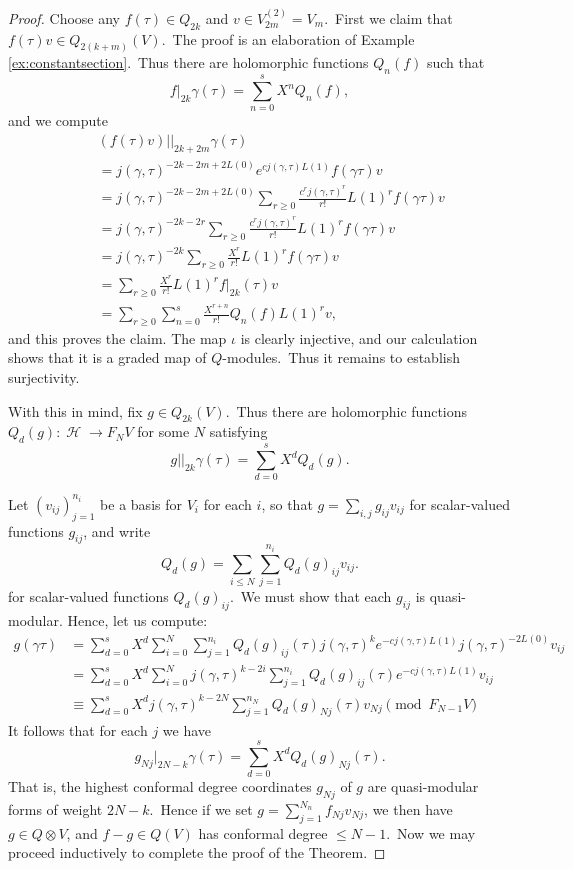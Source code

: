 \documentclass[12pt]{amsart}
\theoremstyle{plain}
\theoremstyle{definition}
\theoremstyle{remark}
\DeclareMathOperator{\uhp}{\mathcal{H}}
\begin{document}
\begin{proof}
Choose any $f(\tau)\in Q_{2k}$ and $v\in V_{2m}^{(2)}=V_{m}$.\ First we claim that
$f(\tau)v\in Q_{2(k+m)}(V)$.\ The proof is an elaboration of Example \ref{ex:constantsection}.\ Thus there are holomorphic functions $Q_n(f)$ such that
$$f|_{2k}\gamma(\tau)=\sum_{n=0}^s X^nQ_n(f),$$
and we compute
\begin{eqnarray*}
&&(f(\tau)v)||_{2k+2m}\gamma(\tau) \\
&&=    j(\gamma, \tau)^{-2k-2m+2L(0)}e^{cj(\gamma, \tau) L(1)}f(\gamma\tau)v\\
&&=j(\gamma, \tau)^{-2k-2m+2L(0)}\sum_{r\geq0} \frac{c^rj(\gamma, \tau)^r}{r!}L(1)^r f(\gamma\tau)v\\
&&=j(\gamma, \tau)^{-2k-2r}\sum_{r\geq0} \frac{c^rj(\gamma, \tau)^r}{r!}L(1)^r f(\gamma\tau)v\\
&&=j(\gamma, \tau)^{-2k}\sum_{r\geq0} \frac{X^r}{r!}L(1)^r f(\gamma\tau)v\\
&&=\sum_{r\geq0} \frac{X^r}{r!}L(1)^r f|_{2k}(\tau)v\\
&&=\sum_{r\geq0}\sum_{n=0}^s \frac{X^{r+n}}{r!}Q_n(f)L(1)^r v,
\end{eqnarray*}
and this proves the claim. The map $\iota$ is clearly injective, and our calculation shows that it is a graded map of $Q$-modules.\ Thus it remains to establish surjectivity.


\medskip
With this in mind, fix $g\in Q_{2k}(V)$.\ Thus there are holomorphic functions
$Q_d(g):\uhp\rightarrow F_NV$ for some $N$ satisfying
$$g||_{2k}\gamma(\tau)=\sum_{d=0}^s X^dQ_d(g).$$


Let $(v_{ij})_{j=1}^{n_i}$ be a basis for $V_i$ for each $i$, so that $g = \sum_{i,j}g_{ij}v_{ij}$ for 
scalar-valued functions $g_{ij}$, and write
\[
Q_d(g) = \sum_{i\leq N}\sum_{j=1}^{n_i}Q_d(g)_{ij}v_{ij}.
\]
for scalar-valued functions $Q_d(g)_{ij}$.\ We must show that each $g_{ij}$ is quasi-modular. Hence, let us compute:
\begin{align*}
    g(\gamma\tau) &= \sum_{d=0}^sX^d\sum_{i=0}^N\sum_{j=1}^{n_i} Q_d(g)_{ij}(\tau) j(\gamma,\tau)^ke^{-cj(\gamma,\tau)L(1)}j(\gamma,\tau)^{-2L(0)}v_{ij}\\
    &=\sum_{d=0}^sX^d\sum_{i=0}^Nj(\gamma,\tau)^{k-2i}\sum_{j=1}^{n_i} Q_d(g)_{ij}(\tau) e^{-cj(\gamma,\tau)L(1)}v_{ij}\\
    &\equiv \sum_{d=0}^sX^dj(\gamma,\tau)^{k-2N}\sum_{j=1}^{n_N} Q_d(g)_{Nj}(\tau) v_{Nj}\pmod{F_{N-1}V}
\end{align*}
It follows that for each $j$ we have
\[
g_{Nj}|_{2N-k}\gamma (\tau) = \sum_{d=0}^sX^dQ_d(g)_{Nj}(\tau).
\]
That is, the highest conformal degree coordinates $g_{Nj}$ of $g$ are quasi-modular forms of weight $2N-k$.\ Hence if we set $g = \sum_{j=1}^{N_n} f_{Nj}v_{Nj}$, we then have $g \in Q\otimes V$, and $f-g \in Q(V)$ has conformal degree $\leq N-1$.\ Now we may proceed inductively to complete the proof of the Theorem.
\end{proof}
\end{document}
